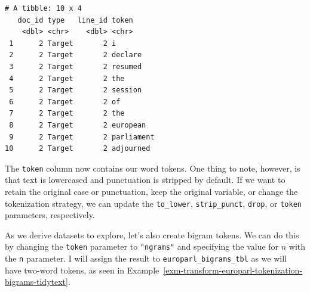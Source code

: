 \documentclass[
  letterpaper,
]{book}
\theoremstyle{definition}
\theoremstyle{remark}
\begin{document}
\begin{verbatim}
# A tibble: 10 x 4
   doc_id type   line_id token     
    <dbl> <chr>    <dbl> <chr>     
 1      2 Target       2 i         
 2      2 Target       2 declare   
 3      2 Target       2 resumed   
 4      2 Target       2 the       
 5      2 Target       2 session   
 6      2 Target       2 of        
 7      2 Target       2 the       
 8      2 Target       2 european  
 9      2 Target       2 parliament
10      2 Target       2 adjourned 
\end{verbatim}

The \texttt{token} column now contains our word tokens. One thing to
note, however, is that text is lowercased and punctuation is stripped by
default. If we want to retain the original case or punctuation, keep the
original variable, or change the tokenization strategy, we can update
the \texttt{to\_lower}, \texttt{strip\_punct}, \texttt{drop}, or
\texttt{token} parameters, respectively.

As we derive datasets to explore, let's also create bigram tokens. We
can do this by changing the \texttt{token} parameter to
\texttt{"ngrams"} and specifying the value for \(n\) with the \texttt{n}
parameter. I will assign the result to \texttt{europarl\_bigrams\_tbl}
as we will have two-word tokens, as seen in
Example~\ref{exm-transform-europarl-tokenization-bigrams-tidytext}.
\end{document}
